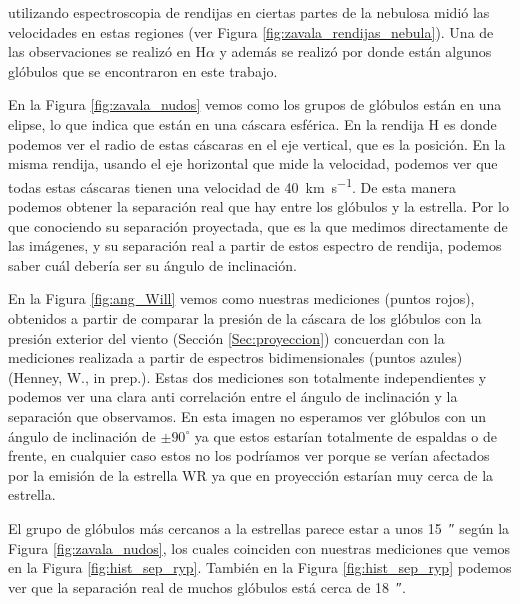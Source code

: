 \documentclass{book}
\begin{document}
\cite{Zavala:2022} utilizando espectroscopia de rendijas en ciertas partes de la nebulosa midió las velocidades en estas regiones (ver Figura \ref{fig:zavala_rendijas_nebula}). Una de las observaciones se realizó en H$\alpha$ y además se realizó por donde están algunos glóbulos que se encontraron en este trabajo. 

En la Figura \ref{fig:zavala_nudos} vemos como los grupos de glóbulos están en una elipse, lo que indica que están en una cáscara esférica. En la rendija H es donde podemos ver el radio de estas cáscaras en el eje vertical, que es la posición. En la misma rendija, usando el eje horizontal que mide la velocidad, podemos ver que todas estas cáscaras tienen una velocidad de \SI{40}{km.s^{-1}}. De esta manera podemos obtener la separación real que hay entre los glóbulos y la estrella. Por lo que conociendo su separación proyectada, que es la que medimos directamente de las imágenes, y su separación real a partir de estos espectro de rendija, podemos saber cuál debería ser su ángulo de inclinación.

En la Figura \ref{fig:ang_Will} vemos como nuestras mediciones (puntos rojos), obtenidos a partir de comparar la presión de la cáscara de los glóbulos con la presión exterior del viento (Sección \ref{Sec:proyeccion}) concuerdan con la mediciones realizada a partir de espectros bidimensionales (puntos azules) (Henney, W., in prep.). Estas dos mediciones son totalmente independientes y podemos ver una clara anti correlación entre el ángulo de inclinación y la separación que observamos. En esta imagen no esperamos ver glóbulos con un ángulo de inclinación de $\pm 90^\circ$ ya que estos estarían totalmente de espaldas o de frente, en cualquier caso estos no los podríamos ver porque se verían afectados por la emisión de la estrella WR ya que en proyección estarían muy cerca de la estrella.

El grupo de glóbulos más cercanos a la estrellas parece estar a unos \SI{15}{\arcsecond} según la Figura \ref{fig:zavala_nudos}, los cuales coinciden con nuestras mediciones que vemos en la Figura \ref{fig:hist_sep_ryp}. También en la Figura \ref{fig:hist_sep_ryp} podemos ver que la separación real de muchos glóbulos está cerca de \SI{18}{\arcsecond}.
\end{document}
